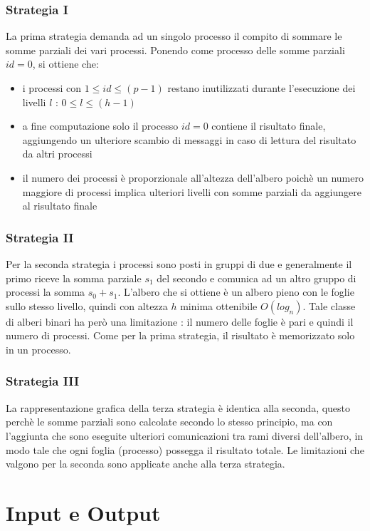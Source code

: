 \documentclass[a4paper,11pt]{book}
\begin{document}
\subsection{Strategia I}
La prima strategia demanda ad un singolo processo il compito di sommare le somme parziali dei vari processi. Ponendo come processo delle somme parziali $id = 0$, si ottiene che:
\begin{itemize}
    \item i processi con $1 \leq id \leq (p-1)$ restano inutilizzati durante l'esecuzione dei livelli $l$ : $ 0 \leq l \leq (h-1)$
    \item a fine computazione solo il processo $id = 0$ contiene il risultato finale, aggiungendo un ulteriore scambio di messaggi in caso di lettura del risultato da altri processi
    \item il numero dei processi è proporzionale all'altezza dell'albero poichè un numero maggiore di processi implica ulteriori livelli con somme parziali da aggiungere al risultato finale
\end{itemize}

\subsection{Strategia II}
Per la seconda strategia i processi sono posti in gruppi di due e generalmente il primo riceve la somma parziale $s_1$ del secondo e comunica ad un altro gruppo di processi la somma $s_0 + s_1$. L'albero che si ottiene è un albero pieno con le foglie sullo stesso livello, quindi con altezza $h$ minima ottenibile $O(log_n)$. Tale classe di alberi binari ha però una limitazione : il numero delle foglie è pari e quindi il numero di processi.
Come per la prima strategia, il risultato è memorizzato solo in un processo.
\subsection{Strategia III}\label{strategia_3}
La rappresentazione grafica della terza strategia è identica alla seconda, questo perchè le somme parziali sono calcolate secondo lo stesso principio, ma con l'aggiunta che sono eseguite ulteriori comunicazioni tra rami diversi dell'albero, in modo tale che ogni foglia (processo) possegga il risultato totale. Le limitazioni che valgono per la seconda sono applicate anche alla terza strategia.

\chapter{Input e Output}
\end{document}
